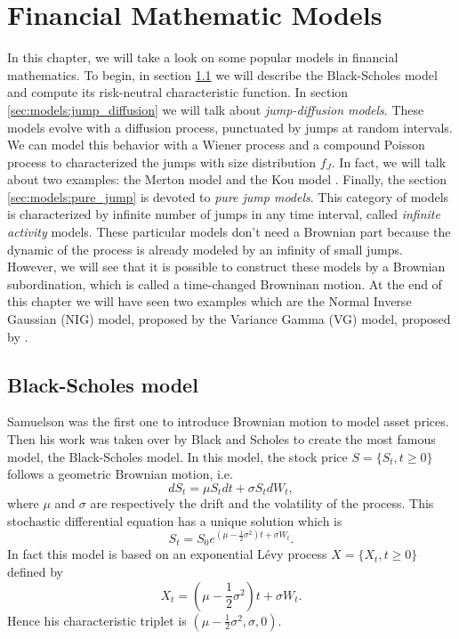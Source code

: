 \chapter{Financial Mathematic Models}
\label{sec:models}


In this chapter, we will take a look on some popular models in financial mathematics. To begin, in section \ref{sec:models:BS} we will describe the Black-Scholes model \citeyearpar{BS73} and compute its risk-neutral characteristic function. In section \ref{sec:models:jump_diffusion} we will talk about \textit{jump-diffusion models}. These models evolve with a diffusion process, punctuated by jumps at random intervals. We can model this behavior with a Wiener process and a compound Poisson process to characterized the jumps with size distribution $f_J$. In fact, we will talk about two examples: the Merton model \citeyearpar{Mer76} and the Kou model \citeyearpar{Kou02}. Finally, the section \ref{sec:models:pure_jump} is devoted to \textit{pure jump models}. This category of models is characterized by infinite number of jumps in any time interval, called \textit{infinite activity} models. These particular models don't need a Brownian part because the dynamic of the process is already modeled by an infinity of small jumps. However, we will see that it is possible to construct these models by a Brownian subordination, which is called a time-changed Browninan motion. At the end of this chapter we will have seen two examples which are the Normal Inverse Gaussian (NIG) model, proposed by \citeauthor{Bar97b} \citeyearpar{Bar97b} the Variance Gamma (VG) model, proposed by \citeauthor{MCC98} \citeyearpar{MCC98}.

\section{Black-Scholes model}
\label{sec:models:BS}
Samuelson \citeyearpar{Sam65} was the first one to introduce Brownian motion to model asset prices. Then his work was taken over by Black and Scholes \citeyearpar{BS73} to create the most famous model, the Black-Scholes model. In this model, the stock price $S=\{S_t,t\geq0\}$ follows a geometric Brownian motion, i.e.
$$dS_t = \mu S_t dt + \sigma S_t dW_t,$$
where $\mu$ and $\sigma$ are respectively the drift and the volatility of the process. This stochastic differential equation has a unique solution which is
$$S_t = S_0e^{\left(\mu-\frac{1}{2}\sigma^2\right)t+\sigma W_t}.$$
In fact this model is based on an exponential L\'evy process $X=\{X_t,t\geq0\}$ defined by
$$X_t = \left(\mu - \frac{1}{2}\sigma^2\right)t + \sigma W_t.$$
Hence his characteristic triplet is $\left(\mu-\frac{1}{2}\sigma^2,\sigma,0\right)$.

